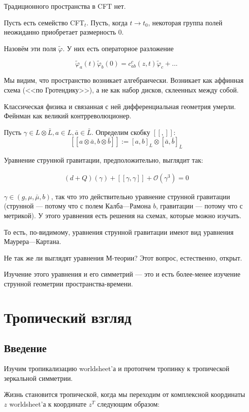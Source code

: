 \documentclass[11pt]{article}
\def\be{\numberwithin{equation}{section}\begin{eqnarray}}
\def\ee{\end{eqnarray}}
\def\ph{\varphi}
\theoremstyle{remark}
\theoremstyle{definition}
\begin{document}
Традиционного пространства в CFT нет.

Пусть есть семейство CFT$_t$. Пусть, когда $t \to t_0$, некоторая группа полей неожиданно приобретает размерность 0.

Назовём эти поля $\tilde \ph$. У них есть операторное разложение

$$\tilde \ph_a (t) \tilde \ph_b (0) = c_{ab}^c (z,t) \tilde \ph_c + ...$$

Мы видим, что пространство возникает алгебраически. Возникает как аффинная схема (<<по Гротендику>>), а не как набор дисков, склеенных между собой.


Классическая физика и связанная с ней дифференциальная геометрия умерли. Фейнман как великий контрреволюционер.

Пусть $\gamma \in L \otimes \bar L, a \in L, \bar a \in \bar L$. Определим скобку $[[,]]$: $$[[a \otimes \bar a, b \otimes \bar b]] := [a, b]_L \otimes [\bar a, \bar b]_{\bar L}$$

Уравнение струнной гравитации, предположительно, выглядит так:

\be (d+Q) (\gamma) + [[\gamma, \gamma]] + \mathcal{O}(\gamma^3) = 0 \ee

$\gamma \in (g, \mu, \bar \mu, b)$, так что это действительно уравнение струнной гравитации (струнной --- потому что с полем Калба---Рамона $b$, гравитации --- потому что с метрикой). У этого уравнения есть решения на схемах, которые можно изучать.

То есть, по-видимому, уравнения струнной гравитации имеют вид уравнения Маурера---Картана.

Не так же ли выглядят уравнения М-теории? Этот вопрос, естественно, открыт.

Изучение этого уравнения и его симметрий --- это и есть более-менее изучение струнной геометрии пространства-времени.

\section{Тропический взгляд}

\subsection{Введение}

Изучим тропикализацию worldsheet'а и протопчем тропинку к тропической зеркальной симметрии.

Жизнь становится тропической, когда мы переходим от комплексной координаты $z$ worldsheet'а к координате $z^T$ следующим образом:
\end{document}
